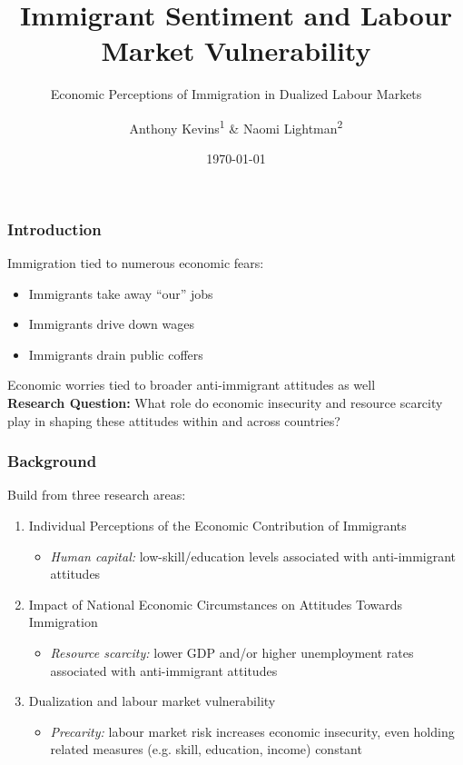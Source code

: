 \documentclass[14pt]{beamer}
\title{Immigrant Sentiment and Labour Market Vulnerability}
\subtitle{Economic Perceptions of Immigration in Dualized Labour Markets}
\author{Anthony Kevins\textsuperscript{1} \& Naomi Lightman\textsuperscript{2}}
\institute{\textsuperscript{1}School of Governance, Utrecht 		University\\
	\textsuperscript{2}Department of Sociology, University of Calgary \bigskip}
\date{\today}
\begin{document}
\begin{frame}
\titlepage
\end{frame}

\begin{frame}
	\frametitle{Introduction}
	Immigration tied to numerous economic fears: 
	\begin{itemize}
		\pause
		\item Immigrants take away ``our'' jobs 
		\pause
		\item Immigrants drive down wages 
		\pause
		\item Immigrants drain public coffers	
	\end{itemize}
	\bigskip
	\pause 
	Economic worries tied to broader anti-immigrant attitudes as well\\
	\bigskip
	\pause 
	\textbf{Research Question:} What role do economic insecurity and resource scarcity play in shaping these attitudes within and across countries? 
\end{frame}

\begin{frame}
	\frametitle{Background}
	Build from three research areas:
	\begin{enumerate}
		\pause
		\item Individual Perceptions of the Economic Contribution of Immigrants
		\begin{itemize}
			\pause
			\item \textit{Human capital:} low-skill/education levels associated with anti-immigrant attitudes
		\end{itemize}
		\pause
		\item Impact of National Economic Circumstances on Attitudes Towards Immigration
		\begin{itemize}
			\pause
			\item \textit{Resource scarcity:} lower GDP and/or higher unemployment rates associated with anti-immigrant attitudes
		\end{itemize}
		\pause
		\item Dualization and labour market vulnerability  
		\begin{itemize}
			\pause 
			\item \textit{Precarity:} labour market risk increases economic insecurity, even holding related measures (e.g. skill, education, income) constant
		\end{itemize}
	\end{enumerate}
\end{frame}
\end{document}
